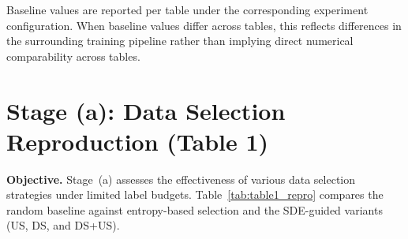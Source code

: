 Baseline values are reported per table under the corresponding experiment
configuration. When baseline values differ across tables, this reflects
differences in the surrounding training pipeline rather than implying
direct numerical comparability across tables.

\section{Stage (a): Data Selection Reproduction (Table 1)}
\label{sec:stage_a_table1}

\noindent
\textbf{Objective.} Stage~(a) assesses the effectiveness of various data
selection strategies under limited label budgets.
Table~\ref{tab:table1_repro} compares the random baseline against
entropy-based selection and the SDE-guided variants (US, DS, and DS+US).


